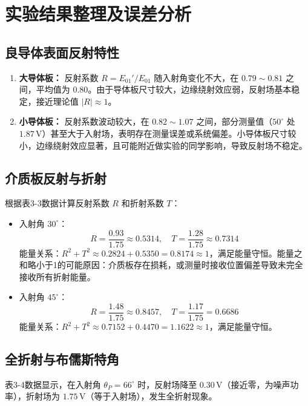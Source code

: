 \documentclass{../ElectromagneticFieldTemplate}
\begin{document}
\section{实验结果整理及误差分析}

\subsection{良导体表面反射特性}

\begin{enumerate}
    \item \textbf{大导体板：} 反射系数 \(R = E_{01}'/E_{01}\) 随入射角变化不大，在 \(0.79 \sim 0.81\) 之间，平均值为 \(0.80\)。由于导体板尺寸较大，边缘绕射效应弱，反射场基本稳定，接近理论值 \(|R| \approx 1\)。
    \item \textbf{小导体板：} 反射系数波动较大，在 \(0.82 \sim 1.07\) 之间，部分测量值（\(50^\circ\) 处 \(1.87\,\text{V}\)）甚至大于入射场，表明存在测量误差或系统偏差。小导体板尺寸较小，边缘绕射效应显著，且可能附近做实验的同学影响，导致反射场不稳定。
\end{enumerate}

\subsection{介质板反射与折射}

根据表3-3数据计算反射系数 \(R\) 和折射系数 \(T\)：

\begin{itemize}
    \item 入射角 \(30^\circ\)：
    \[
    R = \frac{0.93}{1.75} \approx 0.5314, \quad T = \frac{1.28}{1.75} \approx 0.7314
    \]
    能量关系：\(R^2 + T^2 \approx 0.2824 + 0.5350 = 0.8174 \approx 1\)，满足能量守恒。能量之和略小于1的可能原因：介质板存在损耗，或测量时接收位置偏差导致未完全接收所有折射能量。

    \item 入射角 \(45^\circ\)：
    \[
    R = \frac{1.48}{1.75} \approx 0.8457, \quad T = \frac{1.17}{1.75} = 0.6686
    \]
    能量关系：\(R^2 + T^2 \approx 0.7152 + 0.4470 = 1.1622 \approx 1\)，满足能量守恒。
\end{itemize}

\subsection{全折射与布儒斯特角}

表3-4数据显示，在入射角 \(\theta_P = 66^\circ\) 时，反射场降至 \(0.30\,\text{V}\)（接近零，为噪声功率），折射场为 \(1.75\,\text{V}\)（等于入射场），发生全折射现象。
\end{document}

